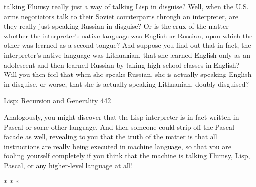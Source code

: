 talking Flumsy really just a way of talking Lisp in disguise?
        Well, when the U.S. arms negotiators talk to their Soviet counterparts through
an interpreter, are they really just speaking Russian in disguise? Or is the crux of the
matter whether the interpreter's native language was English or Russian, upon which
the other was learned as a second tongue? And suppose you find out that in fact, the
interpreter's native language was Lithuanian, that she learned English only as an
adolescent and then learned Russian by taking high-school classes in English? Will
you then feel that when she speaks Russian, she is actually speaking English in
disguise, or worse, that she is actually speaking Lithuanian, doubly disguised?




Lisp: Recursion and Generality                                                         442

        Analogously, you might discover that the Lisp interpreter is in fact written in
Pascal or some other language. And then someone could strip off the Pascal facade as
well, revealing to you that the truth of the matter is that all instructions are really
being executed in machine language, so that you are fooling yourself completely if
you think that the machine is talking Flumsy, Lisp, Pascal, or any higher-level
language at all!

                                        *      *       *

